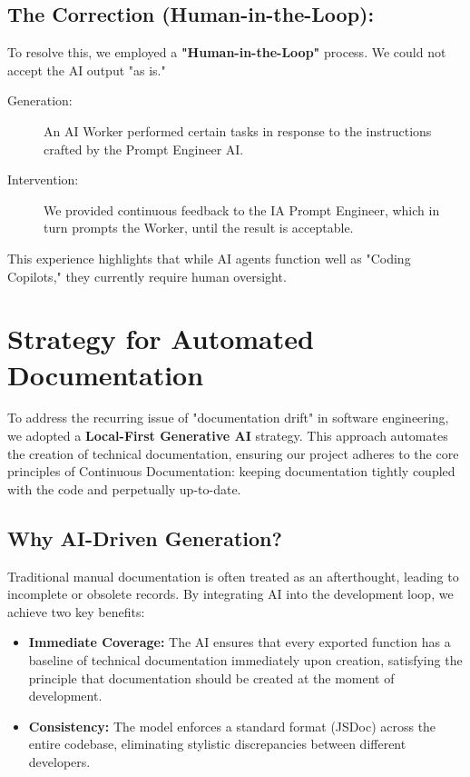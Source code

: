 \documentclass[a4paper,12pt]{report}
\begin{document}
\subsection*{The Correction (Human-in-the-Loop):}
To resolve this, we employed a \textbf{"Human-in-the-Loop"} process. We could not accept the AI output "as is."
\begin{description}
    \item[Generation:] An AI Worker performed certain tasks in response to the instructions crafted by the Prompt Engineer AI.
    
    \item[Intervention:] We provided continuous feedback to the IA Prompt Engineer, which in turn prompts the Worker, until the result is acceptable.
\end{description}
This experience highlights that while AI agents function well as "Coding Copilots," they currently require human oversight.

\section{Strategy for Automated Documentation}
\label{sec:doc-strategy}

To address the recurring issue of "documentation drift" in software engineering, we adopted a \textbf{Local-First Generative AI} strategy. This approach automates the creation of technical documentation, ensuring our project adheres to the core principles of Continuous Documentation: keeping documentation tightly coupled with the code and perpetually up-to-date.

\subsection{Why AI-Driven Generation?}
Traditional manual documentation is often treated as an afterthought, leading to incomplete or obsolete records. By integrating AI into the development loop, we achieve two key benefits:
\begin{itemize}
    \item \textbf{Immediate Coverage:} The AI ensures that every exported function has a baseline of technical documentation immediately upon creation, satisfying the principle that documentation should be created at the moment of development.
    \item \textbf{Consistency:} The model enforces a standard format (JSDoc) across the entire codebase, eliminating stylistic discrepancies between different developers.
\end{itemize}
\end{document}
